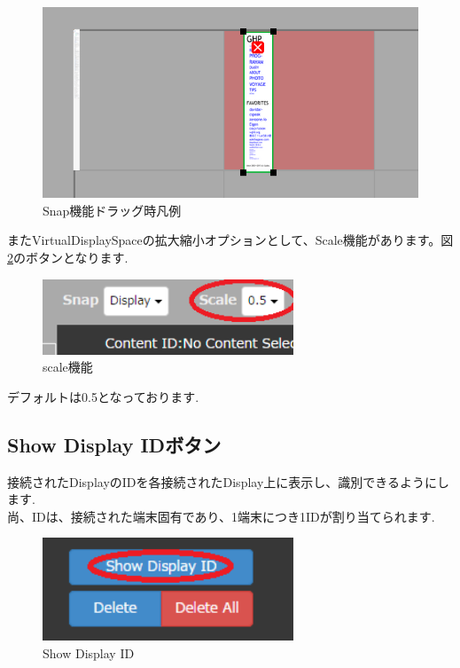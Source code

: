 \documentclass[a4paper,10pt,oneside]{jsbook}
\begin{document}
\begin{figure}[htbp]
	\begin{center}
		\includegraphics[width=15.5cm]{image/Snap1.png}
	\end{center}
	\caption{Snap機能ドラッグ時凡例}
	\label{fig:snapdrag}
\end{figure}

\clearpage 

またVirtualDisplaySpaceの拡大縮小オプションとして、Scale機能があります。図\ref{fig:scale}のボタンとなります.\\

\begin{figure}[htbp]
	\begin{center}
		\includegraphics[width=7.5cm]{image/MIGIUE_Scale.PNG}
	\end{center}
	\caption{scale機能}
	\label{fig:scale}
\end{figure}

デフォルトは0.5となっております.\\



\clearpage 


\subsection{Show Display IDボタン}
接続されたDisplayのIDを各接続されたDisplay上に表示し、識別できるようにします.\\
尚、IDは、接続された端末固有であり、1端末につき1IDが割り当てられます.\\
\begin{figure}[htbp]
	\begin{center}
		\includegraphics[width=7.5cm]{image/3Button1.PNG}
	\end{center}
	\caption{Show Display ID}
	\label{fig:showdisplayid}
\end{figure}
\end{document}
